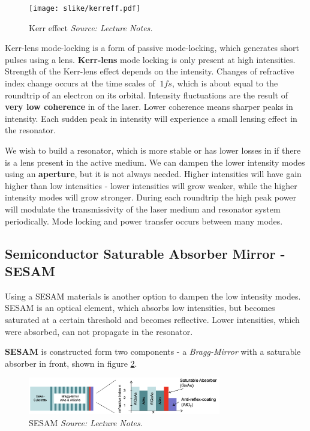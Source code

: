 \begin{figure}
    \centering
    \texttt{[image: slike/kerreff.pdf]}
    \caption{Kerr effect \textit{Source: Lecture Notes.}}
    \label{fig:kerreff}
\end{figure}


Kerr-lens mode-locking is a form of passive mode-locking, which generates short pulses using a lens.
\textbf{Kerr-lens} mode locking is only present at high intensities. Strength of the Kerr-lens effect depends on the intensity.
Changes of refractive index change occurs at the time scales of $~1 fs$, which is about equal to the roundtrip of an electron on
its orbital. Intensity fluctuations are the result of \textbf{very low coherence} in of the laser. Lower coherence means sharper peaks in intensity. 
Each sudden peak in intensity will experience a small lensing effect in the resonator. 

We wish to build a resonator, which is more stable or has lower losses in if there is a lens present in the active medium.
We can dampen the lower intensity modes using an \textbf{aperture}, but it is not always needed. Higher intensities will have gain higher than low intensities - 
lower intensities will grow weaker, while the  higher intensity modes will grow stronger. 
During each roundtrip the high peak power will modulate the transmissivity of the laser medium and resonator system periodically.
Mode locking and power transfer occurs between many modes.

\subsection{Semiconductor Saturable Absorber Mirror - SESAM}
Using a SESAM materials is another option to dampen the low intensity modes. SESAM is an optical element, which 
absorbs low intensities, but becomes saturated at a certain threshold and becomes reflective. Lower intensities, which were absorbed, can
not propagate in the resonator. 

\textbf{SESAM} is constructed form two components - a \textit{Bragg-Mirror} with a 
saturable absorber in front, shown in figure \ref{fig:sesam}.

\begin{figure}[h!]
    \centering
    \includegraphics[width=0.75\textwidth]{slike/sesam.png}
    \caption{SESAM \textit{Source: Lecture Notes.}}
    \label{fig:sesam}
\end{figure}

